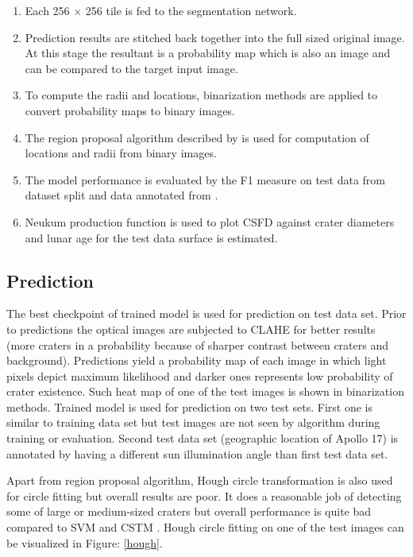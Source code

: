 \documentclass[11pt]{article}
\begin{document}
\begin{enumerate}
	\item Each 256 $\times$ 256 tile is fed to the segmentation network.
	\item Prediction results are stitched back together into the full sized original image. At this stage the resultant is a probability map which is also an image and can be compared to the target input image.
	\item To compute the radii and locations, binarization methods are applied to convert probability maps to binary images.
	\item The region proposal algorithm described by \cite{reiss1993recognizing} is used for computation of locations and radii from binary images.
	\item The model performance is evaluated by the F1 measure on test data from dataset split and data annotated from \cite{dino2020}.
	\item Neukum production function is used to plot CSFD against crater diameters and lunar age for the test data surface is estimated.
\end{enumerate}

\subsection{Prediction}
The best checkpoint of trained model is used for prediction on test data set. Prior to predictions the optical images are subjected to CLAHE for better results (more craters in a probability because of sharper contrast between craters and background). Predictions yield a probability map of each image in which light pixels depict maximum likelihood and darker ones represents low probability of crater existence. Such heat map of one of the test images is shown in binarization methods. Trained model is used for prediction on two test sets. First one is similar to training data set but test images are not seen by algorithm during training or evaluation. Second test data set (geographic location of Apollo 17) is annotated by \cite{dino2020} having a different sun illumination angle than first test data set.

Apart from region proposal algorithm, Hough circle transformation is also used for circle fitting but overall results are poor. It does a reasonable job of detecting some of large or medium-sized craters but overall performance is quite bad compared to SVM and CSTM \cite{wetzler2005learning}. Hough circle fitting on one of the test images can be visualized in Figure: \ref{hough}.
\end{document}
